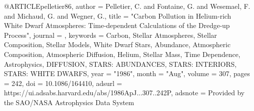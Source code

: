 \documentclass[a4paper,fleqn,usenatbib]{mnras}
\begin{document}
@ARTICLE{pelletier86,
       author = {{Pelletier}, C. and {Fontaine}, G. and {Wesemael}, F. and {Michaud}, G. and
         {Wegner}, G.},
        title = "{Carbon Pollution in Helium-rich White Dwarf Atmospheres: Time-dependent Calculations of the Dredge-up Process}",
      journal = {\apj},
     keywords = {Carbon, Stellar Atmospheres, Stellar Composition, Stellar Models, White Dwarf Stars, Abundance, Atmospheric Composition, Atmospheric Diffusion, Helium, Stellar Mass, Time Dependence, Astrophysics, DIFFUSION, STARS: ABUNDANCES, STARS: INTERIORS, STARS: WHITE DWARFS},
         year = "1986",
        month = "Aug",
       volume = {307},
        pages = {242},
          doi = {10.1086/164410},
       adsurl = {https://ui.adsabs.harvard.edu/abs/1986ApJ...307..242P},
      adsnote = {Provided by the SAO/NASA Astrophysics Data System}
}
\end{document}
